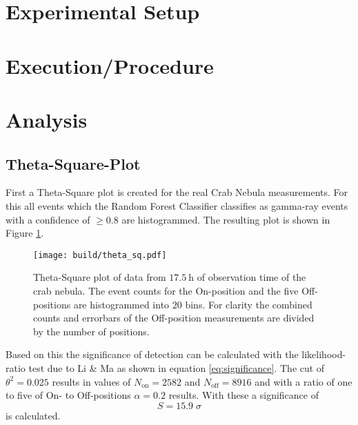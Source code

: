     \section{Experimental Setup}

%
%
    \section{Execution/Procedure}
    
%
%
    \section{Analysis}
        
        \subsection{Theta-Square-Plot}
            First a Theta-Square plot is created for the real Crab Nebula measurements.
            For this all events which the Random Forest Classifier classifies as gamma-ray events with a confidence of $\geq \num{0.8}$ are histogrammed.
            The resulting plot is shown in Figure \ref{fig:theta_sq}.
            \begin{figure}
                \centering
                \texttt{[image: build/theta\_sq.pdf]}
                \caption{
                    Theta-Square plot of data from $\SI{17.5}{\hour}$ of observation time of the crab nebula.
                    The event counts for the On-position and the five Off-positions are histogrammed into 20 bins.
                    For clarity the combined counts and errorbars of the Off-position measurements are divided by the number of positions.
                }
                \label{fig:theta_sq}
            \end{figure}
            Based on this the significance of detection can be calculated with the likelihood-ratio test due to Li \& Ma \cite{} as shown in equation \eqref{eq:significance}.
            The cut of $\theta^2 = 0.025$ results in values of $N_\text{on} = 2582$ and $N_\text{off} = 8916$ and with a ratio of one to five of On- to Off-positions $\alpha = 0.2$ results.
            With these a significance of
            \begin{equation}
                S = 15.9 \; \sigma
            \end{equation}
            is calculated.
            

